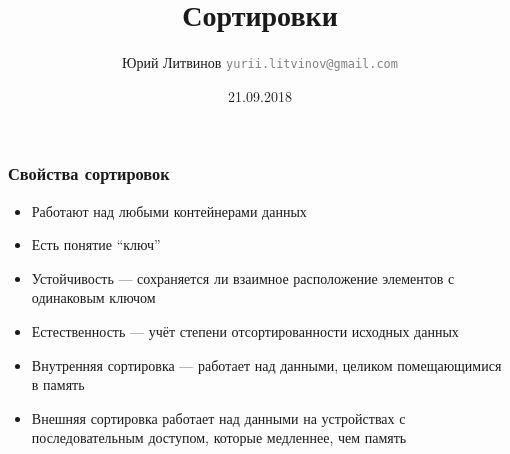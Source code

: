 \documentclass[xetex,mathserif,serif]{beamer}
\title{Сортировки}
\author[Юрий Литвинов]{Юрий Литвинов \newline \textcolor{gray}{\small\texttt{yurii.litvinov@gmail.com}}}
\date{21.09.2018}
\begin{document}
	
	\frame{\titlepage}
	
	\begin{frame}
		\frametitle{Свойства сортировок}
		\begin{itemize}
			\item Работают над любыми контейнерами данных                                        
			\item Есть понятие ``ключ''
			\item Устойчивость --- сохраняется ли взаимное расположение элементов с одинаковым ключом
			\item Естественность --- учёт степени отсортированности исходных данных
			\item Внутренняя сортировка --- работает над данными, целиком помещающимися в память
			\item Внешняя сортировка работает над данными на устройствах с последовательным доступом, которые медленнее, чем память
		\end{itemize}
	\end{frame}
\end{document}
